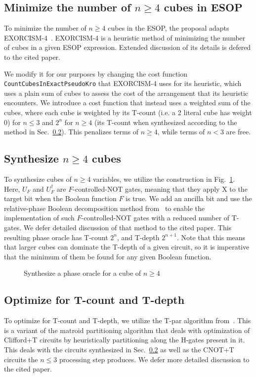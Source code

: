 \subsection{Minimize the number of $n \geq 4$ cubes in ESOP}
\label{Pro:Minimize}

To minimize the number of $n \geq 4$ cubes in the ESOP, the proposal adapts EXORCISM-4~\cite{bib-exorcism}.
EXORCISM-4 is a heuristic method of minimizing the number of cubes in a given ESOP expression. Extended
discussion of its details is defered to the cited paper. 

We modify it for our purposes by changing
the cost function \texttt{CountCubesInExactPseudoKro} that EXORCISM-4 uses for its heuristic, which uses a plain sum
of cubes to assess the cost of the arrangement that its heuristic encounters. We introduce a cost function
that instead uses a weighted sum of the cubes, where each cube is weighted by its T-count (i.e. a 2 literal cube
has weight 0) for $n \leq 3$ and $2^n$ for $n \geq 4$ (its T-count when synthesized according to the method in
Sec.~\ref{Pro:n4}). This penalizes terms of $n \geq 4$, while terms of $n < 3$ are free.


\subsection{Synthesize $n \geq 4$ cubes}
\label{Pro:n4}

To synthesize cubes of $n \geq 4$ variables, we utilize the construction in Fig.~\ref{fig-phase-n4}. Here,
$U_F$ and $U_F^{\dagger}$ are $F$-controlled-NOT gates, meaning that they apply X to the target bit when
the Boolean function $F$ is true. We add an ancilla bit and use the relative-phase Boolean decomposition
method from~\cite{bib-clarino-lut} to enable the implementation of such $F$-controlled-NOT gates with a
reduced number of T-gates. We defer detailed discussion of that method to the cited paper. This resulting
phase oracle has T-count $2^{n}$, and T-depth $2^{n+1}$. Note that this means that larger cubes can
dominate the T-depth of a given circuit, so it is imperative that the minimum of them be found for
any given Boolean function.

\begin{figure}[t]
  \centering
  \scalebox{1.0} {
    
  }
  \caption{Synthesize a phase oracle for a cube of $n \geq 4$}
  \label{fig-phase-n4}
\end{figure}

\subsection{Optimize for T-count and T-depth}
\label{Pro:Tpar}

To optimize for T-count and T-depth, we utilize the T-par algorithm from~\cite{bib-amy-matroid}. This is a
variant of the matroid partitioning algorithm that deals with optimization of Clifford+T circuits by heuristically
partitioning along the H-gates present in it. This deals with the circuits synthesized in Sec.~\ref{Pro:n4} as well
as the CNOT+T circuits the $n \leq 3$ processing step produces. We defer more detailed discussion to the cited
paper.




